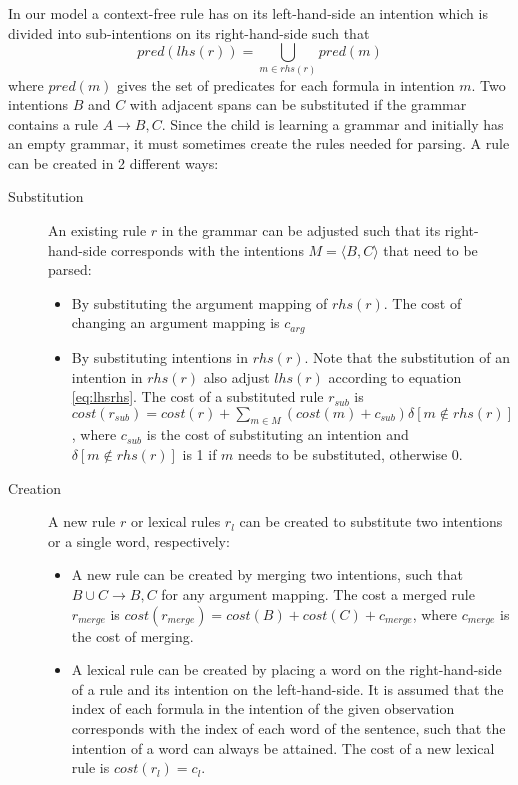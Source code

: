 \documentclass[a4paper]{article}
\begin{document}
In our model a context-free rule has on its left-hand-side an intention which is divided into sub-intentions on its right-hand-side such that 
\begin{equation}
pred(lhs(r)) =  \bigcup_{m \in rhs(r)} pred(m)
\label{eq:lhsrhs}
\end{equation}
where $pred(m)$ gives the set of predicates for each formula in intention $m$.  Two intentions $B$ and $C$ with adjacent spans can be substituted if the grammar contains a rule $A \rightarrow B, C$. Since the child is learning a grammar and initially has an empty grammar, it must sometimes create the rules needed for parsing. A rule can be created in 2 different ways:
\begin{description}
\item[Substitution] An existing rule $r$ in the grammar can be adjusted such that its right-hand-side corresponds with the intentions $M = \langle B, C \rangle$ that need to be parsed:
  \begin{itemize}
  \item By substituting the argument mapping of $rhs(r)$. The cost of changing an argument mapping is $c_{arg}$
  \item By substituting intentions in $rhs(r)$. Note that the substitution of an intention in $rhs(r)$ also adjust $lhs(r)$ according to equation \ref{eq:lhsrhs}. The cost of a substituted rule $r_{sub}$ is $cost(r_{sub}) = cost(r) + \sum_{m \in M} (cost(m) + c_{sub}) \delta[m \notin rhs(r) ]$, where $c_{sub}$ is the cost of substituting an intention and $\delta[m \notin rhs(r) ]$ is 1 if $m$ needs to be substituted, otherwise 0.
  \end{itemize}
\item[Creation] A new rule $r$ or lexical rules $r_l$ can be created to substitute two intentions or a single word, respectively:
  \begin{itemize}
  \item A new rule can be created by merging two intentions, such that $B\cup C \rightarrow B, C$ for any argument mapping. The cost a merged rule $r_{merge}$ is $cost(r_{merge}) = cost(B) + cost(C) + c_{merge}$, where $c_{merge}$ is the cost of merging. 
  \item A lexical rule can be created by placing a word on the right-hand-side of a rule and its intention on the left-hand-side. It is assumed that the index of each formula in the intention of the given observation corresponds with the index of each word of the sentence, such that the intention of a word can always be attained. The cost of a new lexical rule is $cost(r_l) = c_l$.
  \end{itemize}
\end{description}
\end{document}
